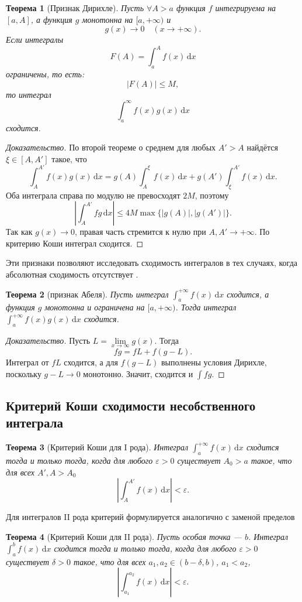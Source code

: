 \documentclass[coursework, och, times]{SCWorks1}
\newtheorem{theorem}{Теорема}
\newcommand{\dd}{\,\mathrm{d}}
\newcommand{\eps}{\varepsilon}
\renewcommand{\le}{\leqslant}
\begin{document}
\begin{theorem}[Признак Дирихле]
Пусть $\forall A > a$ функция \(f\) интегрируема на \([a, A] \), а функция \(g\) монотонна на \([a,+\infty)\) и
\[
g(x)\to0\quad (x\to+\infty).
\]
Если интегралы
\[
F(A)=\int_a^A f(x)\dd x
\]
ограничены, то есть:
\[
|F(A)|\le M,
\]
то интеграл
\[
\int_a^{\infty}f(x)g(x)\dd x
\]
сходится.
\end{theorem}
\begin{proof}[Доказательство]
По второй теореме о среднем для любых \(A'>A\) найдётся \(\xi\in[A,A']\) такое, что
\[
\int_A^{A'}f(x)g(x)\dd x
=
g(A)\int_A^\xi f(x)\dd x
+
g(A')\int_\xi^{A'}f(x)\dd x.
\]
Оба интеграла справа по модулю не превосходят \(2M\), поэтому
\[
\left|\int_A^{A'}f g\dd x\right|
\le 4M\max\{|g(A)|,|g(A')|\}.
\]
Так как \(g(x)\to0\), правая часть стремится к нулю при \(A,A'\to+\infty\). По критерию Коши интеграл сходится.
\end{proof}
Эти признаки позволяют исследовать сходимость интегралов в тех случаях, когда абсолютная сходимость отсутствует \cite{ilinpozniak}.
\begin{theorem}[признак Абеля]\label{th:Abel}
Пусть интеграл $\int_a^{+\infty}f(x)\dd x$ сходится, а функция $g$ монотонна и ограничена на $[a,+\infty)$. Тогда интеграл $\int_a^{+\infty}f(x)g(x)\dd x$ сходится.
\end{theorem}
\begin{proof}[Доказательство]
Пусть \(L=\lim\limits_{x\to\infty}g(x)\). Тогда
\[
fg=fL+f(g-L).
\]
Интеграл от \(fL\) сходится, а для \(f(g-L)\) выполнены условия Дирихле, поскольку \(g-L\to0\) монотонно. Значит, сходится и \(\int fg\).
\end{proof}

\subsection{Критерий Коши сходимости несобственного интеграла}\label{sec:Cauchy}

\begin{theorem}[Критерий Коши для I рода]
Интеграл \(\int_a^{+\infty}f(x)\dd x\) сходится тогда и только тогда, когда для любого \(\eps>0\) существует \(A_0>a\) такое, что для всех \(A',A>A_0\)
\[
\left|\int_A^{A'}f(x)\dd x\right|<\eps.
\]
\end{theorem}

Для интегралов II рода критерий формулируется аналогично с заменой пределов \cite{vinogradova}
\begin{theorem}[Критерий Коши для II рода]
Пусть особая точка — \(b\). Интеграл \(\int_a^b f(x)\dd x\) сходится тогда и только тогда, когда для любого \(\eps>0\) существует \(\delta>0\) такое, что для всех \(a_1,a_2\in(b-\delta,b)\), \(a_1<a_2\),
\[
\left|\int_{a_1}^{a_2}f(x)\dd x\right|<\eps.
\]
\end{theorem}
\end{document}
